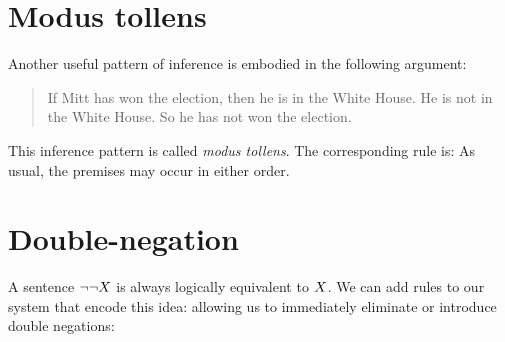 \section{Modus tollens}
Another useful pattern of inference is embodied in the following argument:
	\begin{quote}
		If Mitt has won the election, then he is in the White House. He is not in the White House. So he has not won the election.
	\end{quote}
This inference pattern is called \emph{modus tollens}. The corresponding rule is:
As usual, the premises may occur in either order.


\section{Double-negation}
A sentence $\neg\neg X$ is always logically equivalent to $X$.
We can add rules to our system that encode this idea: allowing us to immediately eliminate or introduce double negations:
\begin{highlighted}
\begin{pf}
\end{pf}
\end{highlighted}
\begin{highlighted}
\begin{pf}
\end{pf}
\end{highlighted}
%
%

